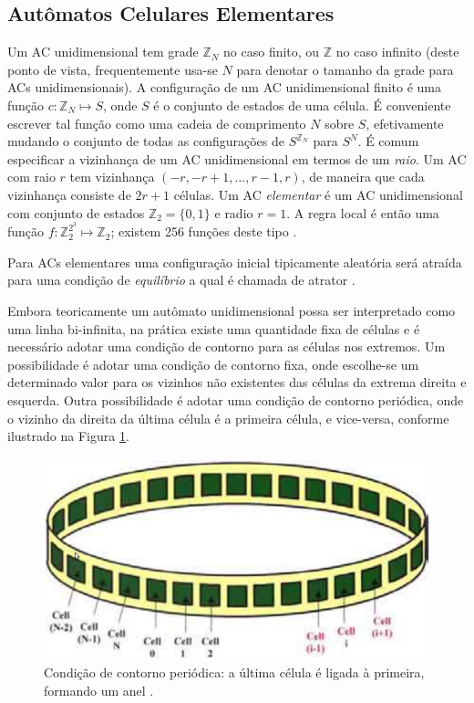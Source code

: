 \documentclass[12pt,a4paper]{article}
\begin{document}
\subsection{Autômatos Celulares Elementares}

Um AC unidimensional tem grade $\mathbb{Z}_N$ no caso finito, ou $\mathbb{Z}$
no caso infinito (deste ponto de vista, frequentemente usa-se $N$ para denotar
o tamanho da grade para ACs unidimensionais). A configuração de um AC
unidimensional finito é uma função $c: \mathbb{Z}_N \mapsto S$, onde $S$ é o
conjunto de estados de uma célula. É conveniente escrever tal função como
uma cadeia de comprimento $N$ sobre $S$, efetivamente mudando o conjunto de
todas as configurações de $S^{\mathbb{Z}_N}$ para $S^N$. É comum especificar
a vizinhança de um AC unidimensional em termos de um
\textit{raio}. Um AC com raio $r$ tem vizinhança $(-r,-r+1,\ldots,r-1,r)$,
de maneira que cada vizinhança consiste de $2r+1$ células. Um AC
\textit{elementar} é um AC unidimensional com conjunto de estados
$\mathbb{Z}_2 = \{0,1\}$ e radio $r=1$. A regra local é então uma função
$f: \mathbb{Z}^{2^3}_2 \mapsto \mathbb{Z}_2$; existem 256 funções deste
tipo .

Para ACs elementares uma configuração inicial tipicamente aleatória será atraída
para uma condição de \textit{equilíbrio} a qual é chamada de atrator .

Embora teoricamente um autômato unidimensional possa ser interpretado como uma linha bi-infinita,
na prática existe uma quantidade fixa de células e é necessário adotar uma condição de contorno
para as células nos extremos. Um possibilidade é adotar uma condição de contorno fixa, onde
escolhe-se um determinado valor para os vizinhos não existentes das células da extrema direita
e esquerda. Outra possibilidade é adotar uma condição de contorno periódica, onde o vizinho
da direita da última célula é a primeira célula, e vice-versa, conforme ilustrado na Figura
\ref{fig:ring}.

\begin{figure}[htp]
\begin{center}
\includegraphics[scale=0.3]{img/ring.eps}
\caption{Condição de contorno periódica: a última célula é ligada à primeira,
formando um anel .}
\label{fig:ring}
\end{center}
\end{figure}
\end{document}
